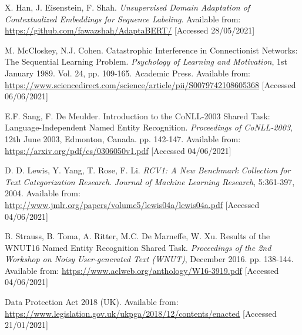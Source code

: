 \begin{thebibliography}{9}
X. Han, J. Eisenstein, F. Shah. \textit{Unsupervised Domain Adaptation of Contextualized Embeddings for Sequence Labeling}. Available from: \url{https://github.com/fawazshah/AdaptaBERT/} [Accessed 28/05/2021]

M. McCloskey, N.J. Cohen. Catastrophic Interference in Connectionist Networks: The Sequential Learning Problem. \textit{Psychology of Learning and Motivation}, 1st January 1989. Vol. 24, pp. 109-165. Academic Press. Available from: \url{https://www.sciencedirect.com/science/article/pii/S0079742108605368} [Accessed 06/06/2021]

E.F. Sang, F. De Meulder. Introduction to the CoNLL-2003 Shared Task: Language-Independent Named Entity Recognition. \textit{Proceedings of CoNLL-2003}, 12th June 2003, Edmonton, Canada. pp. 142-147. Available from: \url{https://arxiv.org/pdf/cs/0306050v1.pdf} [Accessed 04/06/2021]

D. D. Lewis, Y. Yang, T. Rose, F. Li. \textit{RCV1: A New Benchmark Collection for Text Categorization Research}. \textit{Journal of Machine Learning Research}, 5:361-397, 2004. Available from: \url{http://www.jmlr.org/papers/volume5/lewis04a/lewis04a.pdf} [Accessed 04/06/2021]

B. Strauss, B. Toma, A. Ritter, M.C. De Marneffe, W. Xu. Results of the WNUT16 Named Entity Recognition Shared Task. \textit{Proceedings of the 2nd Workshop on Noisy User-generated Text (WNUT)}, December 2016. pp. 138-144. Available from: \url{https://www.aclweb.org/anthology/W16-3919.pdf} [Accessed 04/06/2021]

Data Protection Act 2018 (UK). Available from: \url{https://www.legislation.gov.uk/ukpga/2018/12/contents/enacted} [Accessed 21/01/2021]

\end{thebibliography}